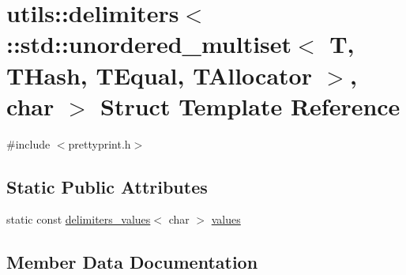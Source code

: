 \hypertarget{structutils_1_1delimiters_3_01_1_1std_1_1unordered__multiset_3_01_t_00_01_t_hash_00_01_t_equal_00bd7241f6d7fb529728590d65babd7b5}{}\section{utils\+::delimiters$<$ \+::std\+::unordered\+\_\+multiset$<$ T, T\+Hash, T\+Equal, T\+Allocator $>$, char $>$ Struct Template Reference}
\label{structutils_1_1delimiters_3_01_1_1std_1_1unordered__multiset_3_01_t_00_01_t_hash_00_01_t_equal_00bd7241f6d7fb529728590d65babd7b5}


{\ttfamily \#include $<$prettyprint.\+h$>$}

\subsection*{Static Public Attributes}
\begin{DoxyCompactItemize}
\item 
static const \mbox{\hyperlink{structutils_1_1delimiters__values}{delimiters\+\_\+values}}$<$ char $>$ \mbox{\hyperlink{structutils_1_1delimiters_3_01_1_1std_1_1unordered__multiset_3_01_t_00_01_t_hash_00_01_t_equal_00bd7241f6d7fb529728590d65babd7b5_a5ff15801b40ce3d034263e6c53b9dae3}{values}}
\end{DoxyCompactItemize}


\subsection{Member Data Documentation}
\mbox{\label{structutils_1_1delimiters_3_01_1_1std_1_1unordered__multiset_3_01_t_00_01_t_hash_00_01_t_equal_00bd7241f6d7fb529728590d65babd7b5_a5ff15801b40ce3d034263e6c53b9dae3}} 
